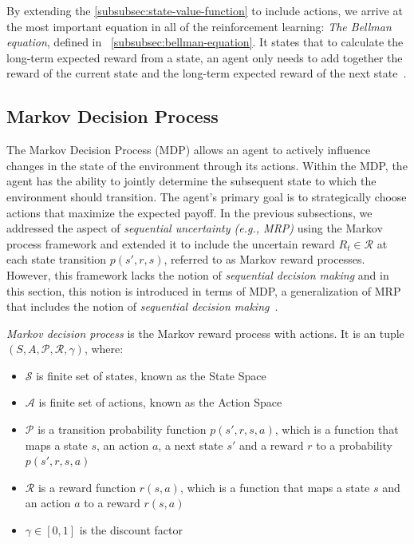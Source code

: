 \documentclass[../xlapes02]{subfiles}
\begin{document}
    By extending the \cref{subsubsec:state-value-function} to include actions, we arrive at the most important equation in all of the reinforcement learning: \emph{The Bellman equation}, defined in ~\cref{subsubsec:bellman-equation}. It states that to calculate the long-term expected reward from a state, an agent only needs to add together the reward of the current state and the long-term expected reward of the next state~\cite{FITMT25127}.

    \subsection{Markov Decision Process}\label{subsec:markov-decision-process}
    The Markov Decision Process (MDP) allows an agent to actively influence changes in the state of the environment through its actions. Within the MDP, the agent has the ability to jointly determine the subsequent state to which the environment should transition. The agent's primary goal is to strategically choose actions that maximize the expected payoff. In the previous subsections, we addressed the aspect of \emph{sequential uncertainty (e.g., MRP)} using the Markov process framework and extended it to include the uncertain reward $R_t\in\mathcal{R}$ at each state transition $p(s',r,s)$, referred to as Markov reward processes. However, this framework lacks the notion of \emph{sequential decision making} and in this section, this notion is introduced in terms of MDP, a generalization of MRP that includes the notion of \emph{sequential decision making}~\cite{rao2022foundations}.
%
    \begin{definition}
        \emph{Markov decision process} is the Markov reward process with actions. It is an tuple $(S,A,\mathcal{P},\mathcal{R},\gamma)$, where:
        \begin{itemize}
            \item $\mathcal{S}$ is finite set of states, known as the State Space
            \item $\mathcal{A}$ is finite set of actions, known as the Action Space
            \item $\mathcal{P}$ is a transition probability function $p(s',r,s,a)$, which is a function that maps a state $s$, an action $a$, a next state $s'$ and a reward $r$ to a probability $p(s',r,s,a)$
            \item $\mathcal{R}$ is a reward function $r(s,a)$, which is a function that maps a state $s$ and an action $a$ to a reward $r(s,a)$
            \item $\gamma\in[0,1]$ is the discount factor
        \end{itemize}
    \end{definition}
\end{document}
